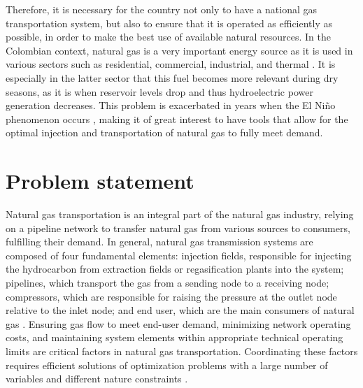 Therefore, it is necessary for the country not only to have a national gas transportation system, but also to ensure that it is operated as efficiently as possible, in order to make the best use of available natural resources. In the Colombian context, natural gas is a very important energy source as it is used in various sectors such as residential, commercial, industrial, and thermal \cite{Restrepo-Trujillo_Moreno-Chuquen_Jiménez-García_Flores_Chamorro_2022}. It is especially in the latter sector that this fuel becomes more relevant during dry seasons, as it is when reservoir levels drop and thus hydroelectric power generation decreases. This problem is exacerbated in years when the El Niño phenomenon occurs \cite{paper-col}, making it of great interest to have tools that allow for the optimal injection and transportation of natural gas to fully meet demand.

    
\section{Problem statement}

Natural gas transportation is an integral part of the natural gas industry, relying on a pipeline network to transfer natural gas from various sources to consumers, fulfilling their demand. In general, natural gas transmission systems are composed of four fundamental elements: injection fields, responsible for injecting the hydrocarbon from extraction fields or regasification plants into the system; pipelines, which transport the gas from a sending node to a receiving node; compressors, which are responsible for raising the pressure at the outlet node relative to the inlet node; and end user, which are the main consumers of natural gas \cite{review}. Ensuring gas flow to meet end-user demand, minimizing network operating costs, and maintaining system elements within appropriate technical operating limits are critical factors in natural gas transportation. Coordinating these factors requires efficient solutions of optimization problems with a large number of variables and different nature constraints  \cite{Conejo}.

